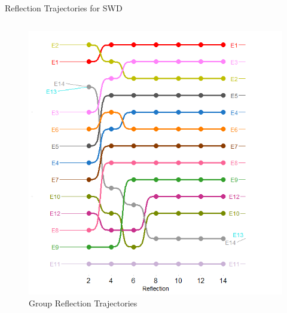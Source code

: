 \documentclass[
  ignorenonframetext,
]{beamer}
\begin{document}
\begin{frame}{Reflection Trajectories for SWD}
\begin{columns}[T]
\begin{column}{0.5\textwidth}
\begin{figure}
{\centering \includegraphics{Plots/g-reflections-sw.png}

}

\caption{Group Reflection Trajectories}

\end{figure}
\end{column}
\end{columns}
\end{frame}
\end{document}
